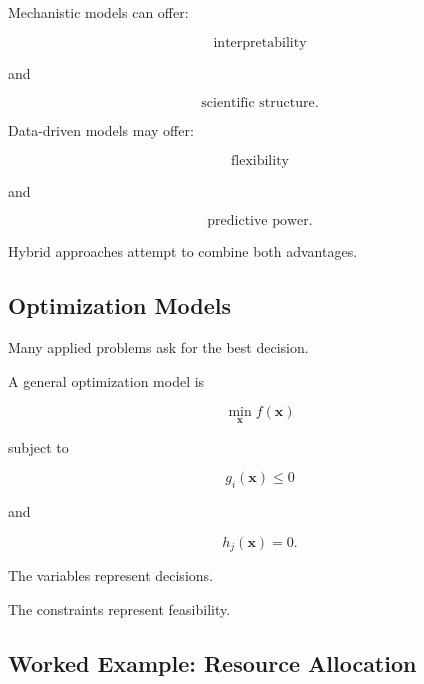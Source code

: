 Mechanistic models can offer:

\[
\boxed{
\text{interpretability}
}
\]

and

\[
\boxed{
\text{scientific structure}.
}
\]

Data-driven models may offer:

\[
\boxed{
\text{flexibility}
}
\]

and

\[
\boxed{
\text{predictive power}.
}
\]

Hybrid approaches attempt to combine both advantages.

\subsection{Optimization Models}
\label{subsec:modeling-optimization-models}

Many applied problems ask for the best decision.

A general optimization model is

\[
\boxed{
\min_{\mathbf{x}}
f(\mathbf{x})
}
\]

subject to

\[
\boxed{
g_i(\mathbf{x})\leq0
}
\]

and

\[
\boxed{
h_j(\mathbf{x})=0.
}
\]

The variables represent decisions.

The constraints represent feasibility.

\subsection{Worked Example: Resource Allocation}
\label{subsec:worked-resource-allocation-model}

